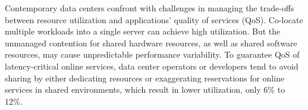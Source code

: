 
\begin{eabstract}
  Contemporary data centers confront with challenges in
  managing the trade-offs between resource utilization and
  applications’ quality of services (QoS). 
  Co-locate multiple workloads into a single server can
  achieve high utilization.
  But the unmanaged contention for shared hardware resources,
  as well as shared software resources,
  may cause unpredictable performance variability.
  To guarantee QoS of latency-critical online services,
  data center operators or developers tend to avoid sharing by
  either dedicating resources or exaggerating reservations
  for online services in shared environments,
  which result in lower utilization, only 6\% to 12\%.

  
\end{eabstract}


